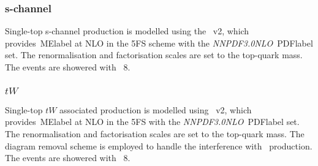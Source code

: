 \subsubsection{s-channel}
Single-top s-channel production is modelled using the \POWHEGBOX~v2, which provides~\acrshort{MElabel} at NLO in the 5FS scheme with the \textit{NNPDF3.0NLO}~\acrshort{PDFlabel} set. The renormalisation and factorisation scales are set to the top-quark mass. The events are showered with \PYTHIA~8.

\subsubsection{$tW$}
Single-top $tW$ associated production is modelled using \POWHEGBOX~v2, which provides~\acrshort{MElabel} at NLO in the 5FS with the \textit{NNPDF3.0NLO}~\acrshort{PDFlabel} set. The renormalisation and factorisation scales are set to the top-quark mass. The diagram removal scheme is employed to handle the interference with \ttbar\ production. %
The events are showered with \PYTHIA~8.


